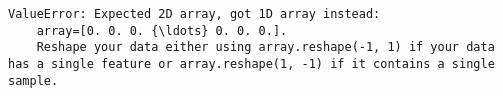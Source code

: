 \documentclass[11pt]{article}
\begin{document}
\begin{Verbatim}[commandchars=\\\{\}]
        ValueError: Expected 2D array, got 1D array instead:
    array=[0. 0. 0. {\ldots} 0. 0. 0.].
    Reshape your data either using array.reshape(-1, 1) if your data has a single feature or array.reshape(1, -1) if it contains a single sample.

    \end{Verbatim}


    
    
    
    
\end{document}
